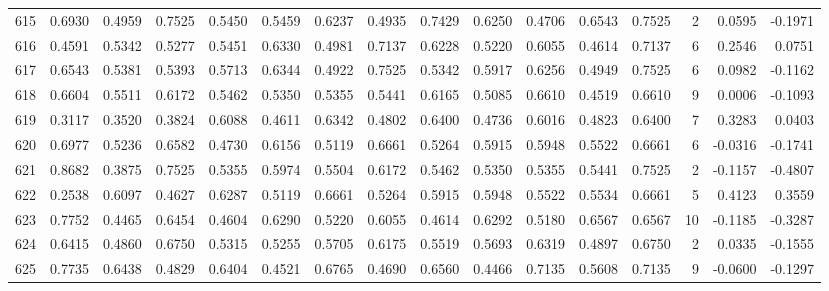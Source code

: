 \begin{tabular}{lrrrrrrrrrrrrrrr}
615 &      0.6930 &  0.4959 &  0.7525 &  0.5450 &  0.5459 &  0.6237 &  0.4935 &  0.7429 &  0.6250 &  0.4706 &   0.6543 &     0.7525 &      2 &                    0.0595 &                    -0.1971 \\
616 &      0.4591 &  0.5342 &  0.5277 &  0.5451 &  0.6330 &  0.4981 &  0.7137 &  0.6228 &  0.5220 &  0.6055 &   0.4614 &     0.7137 &      6 &                    0.2546 &                     0.0751 \\
617 &      0.6543 &  0.5381 &  0.5393 &  0.5713 &  0.6344 &  0.4922 &  0.7525 &  0.5342 &  0.5917 &  0.6256 &   0.4949 &     0.7525 &      6 &                    0.0982 &                    -0.1162 \\
618 &      0.6604 &  0.5511 &  0.6172 &  0.5462 &  0.5350 &  0.5355 &  0.5441 &  0.6165 &  0.5085 &  0.6610 &   0.4519 &     0.6610 &      9 &                    0.0006 &                    -0.1093 \\
619 &      0.3117 &  0.3520 &  0.3824 &  0.6088 &  0.4611 &  0.6342 &  0.4802 &  0.6400 &  0.4736 &  0.6016 &   0.4823 &     0.6400 &      7 &                    0.3283 &                     0.0403 \\
620 &      0.6977 &  0.5236 &  0.6582 &  0.4730 &  0.6156 &  0.5119 &  0.6661 &  0.5264 &  0.5915 &  0.5948 &   0.5522 &     0.6661 &      6 &                   -0.0316 &                    -0.1741 \\
621 &      0.8682 &  0.3875 &  0.7525 &  0.5355 &  0.5974 &  0.5504 &  0.6172 &  0.5462 &  0.5350 &  0.5355 &   0.5441 &     0.7525 &      2 &                   -0.1157 &                    -0.4807 \\
622 &      0.2538 &  0.6097 &  0.4627 &  0.6287 &  0.5119 &  0.6661 &  0.5264 &  0.5915 &  0.5948 &  0.5522 &   0.5534 &     0.6661 &      5 &                    0.4123 &                     0.3559 \\
623 &      0.7752 &  0.4465 &  0.6454 &  0.4604 &  0.6290 &  0.5220 &  0.6055 &  0.4614 &  0.6292 &  0.5180 &   0.6567 &     0.6567 &     10 &                   -0.1185 &                    -0.3287 \\
624 &      0.6415 &  0.4860 &  0.6750 &  0.5315 &  0.5255 &  0.5705 &  0.6175 &  0.5519 &  0.5693 &  0.6319 &   0.4897 &     0.6750 &      2 &                    0.0335 &                    -0.1555 \\
625 &      0.7735 &  0.6438 &  0.4829 &  0.6404 &  0.4521 &  0.6765 &  0.4690 &  0.6560 &  0.4466 &  0.7135 &   0.5608 &     0.7135 &      9 &                   -0.0600 &                    -0.1297 \\

\end{tabular}
